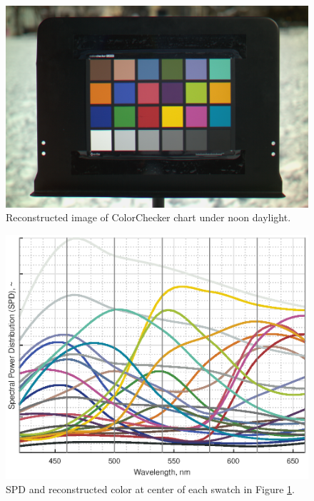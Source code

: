 \documentclass[twocolumn,10pt]{asme2ej}
\begin{document}
\begin{figure}[H]
\begin{centering}
  \includegraphics[height=0.55\linewidth]{colorchecker.png}
  \caption{Reconstructed image of ColorChecker chart under noon daylight.}
  \label{colorchecker_mesh}
  \end{centering}
\end{figure}

\begin{figure}[H]
\begin{centering}
  \includegraphics[height=0.6\linewidth]{colorchecker_SPDs.eps}
  \caption{SPD and reconstructed color at center of each swatch in Figure \ref{colorchecker_mesh}.}
  \label{colorchecker_SPDs}
    \end{centering}
\end{figure}

\clearpage
\end{document}
